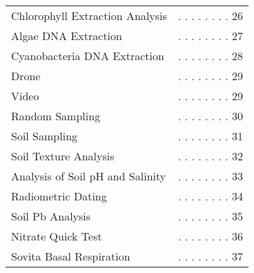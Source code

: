 \documentclass[18pt]{memoir}\usepackage[]{graphicx}\usepackage[]{color}
\begin{document}
\begin{table}[ht]
\begin{tabular}{ll}
  Chlorophyll Extraction Analysis & . . . . . . . .  26 \\ 
  Algae DNA Extraction & . . . . . . . .  27 \\ 
  Cyanobacteria DNA Extraction & . . . . . . . .  28 \\ 
  Drone & . . . . . . . .  29 \\ 
   Video & . . . . . . . .  29 \\ 
  Random Sampling & . . . . . . . .  30 \\ 
  Soil Sampling & . . . . . . . .  31 \\ 
  Soil Texture Analysis & . . . . . . . .  32 \\ 
  Analysis of Soil pH and Salinity & . . . . . . . .  33 \\ 
  Radiometric Dating & . . . . . . . .  34 \\ 
  Soil Pb Analysis & . . . . . . . .  35 \\ 
  Nitrate Quick Test & . . . . . . . .  36 \\ 
  Sovita Basal Respiration & . . . . . . . .  37 \\ 
   \bottomrule
\end{tabular}
\end{table}
\end{document}
